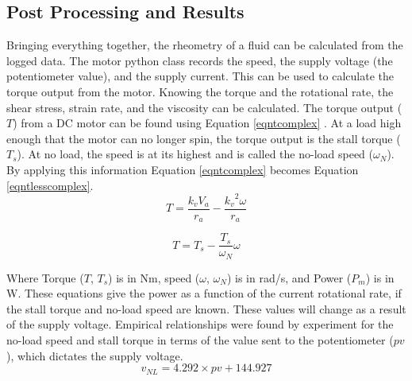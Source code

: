 \documentclass[twoside,a4]{report}
\begin{document}
	\subsection*{Post Processing and Results} %
	Bringing everything together, the rheometry of a fluid can be calculated from the logged data. The motor python class records the speed, the supply voltage (the potentiometer value), and the supply current. This can be used to calculate the torque output from the motor. Knowing the torque and the rotational rate, the shear stress, strain rate, and the viscosity can be calculated. The torque output (\(T\)) from a DC motor can be found using Equation \ref{eqntcomplex} \cite[p.~111-112]{backdcmotor}. At a load high enough that the motor can no longer spin, the torque output is the stall torque (\(T_s\)). At no load, the speed is at its highest and is called the no-load speed (\(\omega_N\)). By applying this information Equation \ref{eqntcomplex} becomes Equation \ref{eqntlesscomplex}.
	\begin{equation}
	T = \frac{k_v V_a}{r_a} - \frac{{{k_v}^2} \omega}{r_a}
	\label{eqntcomplex}
	\end{equation}
	
	
	\begin{equation}
	T = T_s - \frac{T_s}{\omega_N} \omega
	\label{eqntlesscomplex}
	\end{equation}
	
	
	\noindent
	Where Torque (\(T\), \(T_s\)) is in Nm, speed (\(\omega\), \(\omega_N\)) is in rad/s, and Power (\(P_m\)) is in W. These equations give the power as a function of the current rotational rate, if the stall torque and no-load speed are known. These values will change as a result of the supply voltage. Empirical relationships were found by experiment for the no-load speed and stall torque in terms of the value sent to the potentiometer (\(pv\)), which dictates the supply voltage.
	\begin{equation}
	v_{NL} = 4.292 \times pv + 144.927
	\label{eqnsvemp}
	\end{equation}
	
\end{document}
